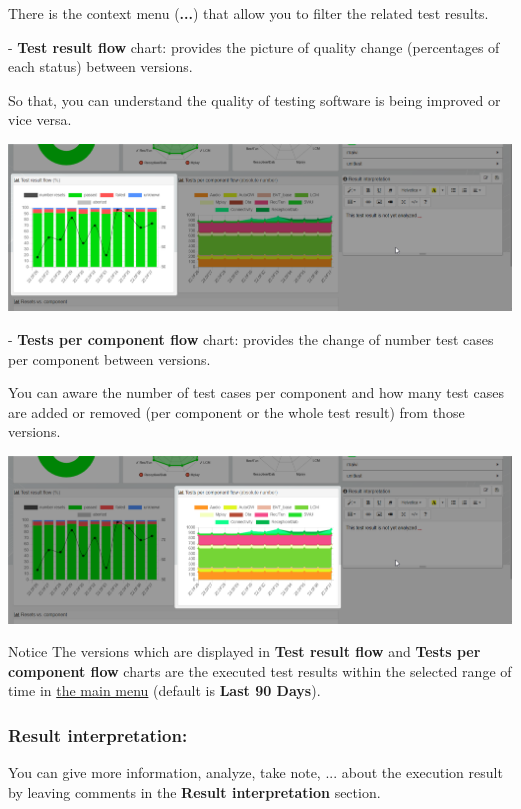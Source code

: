 There is the context menu (\textbf{...}) that allow you to filter the related 
test results.

- \textbf{Test result flow} chart: provides the picture of quality change 
(percentages of each status) between versions. 

So that, you can understand the quality of testing software is being improved 
or vice versa.

\includegraphics[width=1\linewidth]{./pictures/dashboard/chart_test_result_flow.png}

- \textbf{Tests per component flow} chart: provides the change of number test
cases per component between versions.

You can aware the number of test cases per component and how many test cases are
added or removed (per component or the whole test result) from those versions.

\includegraphics[width=1\linewidth]
{./pictures/dashboard/chart_tests_per_component_flow.png}

\begin{boxhint}{Notice}
The versions which are displayed in \textbf{Test result flow} and 
\textbf{Tests per component flow} charts are the executed test results within 
the selected range of time in 
\hyperref[main-menu]{the main menu} (default is \textbf{Last 90 Days}).
\end{boxhint}

\subsubsection{Result interpretation:}
You can give more information, analyze, take note, ... about the execution
result by leaving comments in the \textbf{Result interpretation} section.

